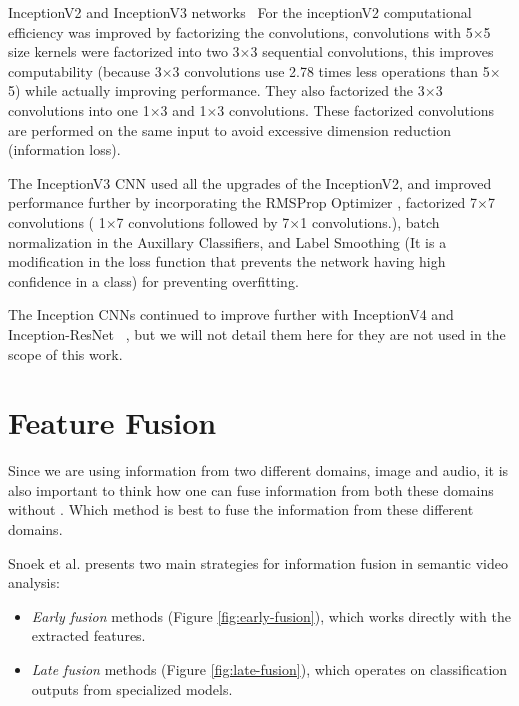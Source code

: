 InceptionV2 and InceptionV3 networks~\cite{szegedy2016rethinking}
For the inceptionV2 computational efficiency was improved by factorizing the convolutions, convolutions with 5$\times$5 size kernels were factorized into two 3$\times$3 sequential convolutions, this improves computability (because 3$\times$3 convolutions use 2.78 times less operations than 5$\times$5) while actually improving performance. They also factorized the 3$\times$3 convolutions into one 1$\times$3 and 1$\times$3 convolutions. These factorized convolutions are performed on the same input to avoid excessive dimension reduction (information loss).

The InceptionV3 CNN used all the upgrades of the InceptionV2, and improved performance further by incorporating the RMSProp Optimizer \cite{tieleman2017rmsprop}, factorized 7$\times$7 convolutions ( 1$\times$7 convolutions followed
by 7$\times$1 convolutions.), batch normalization in the Auxillary Classifiers, and Label Smoothing (It is a modification in the loss function that prevents the network having high confidence in a class) for preventing overfitting.



The Inception CNNs continued to improve further with InceptionV4 and Inception-ResNet ~\cite{szegedy2017inceptionv4}, but we will not detail them here for they are not used in the scope of this work.


\newpage
\section{Feature Fusion}
\label{sec:feature_fusion}

Since we are using information from two different domains, image and audio, it is also important to think how one can fuse information from both these domains without . 
Which method is best to fuse the information from these different domains.

Snoek et al. \cite{snoek2005featurefusion} presents two main strategies for information fusion in semantic video analysis: 
\begin{itemize}
    \item \emph{Early fusion} methods (Figure \ref{fig:early-fusion}), which works directly with the extracted features.
    \item \emph{Late fusion} methods (Figure \ref{fig:late-fusion}), which operates on classification outputs from specialized models.
\end{itemize}

